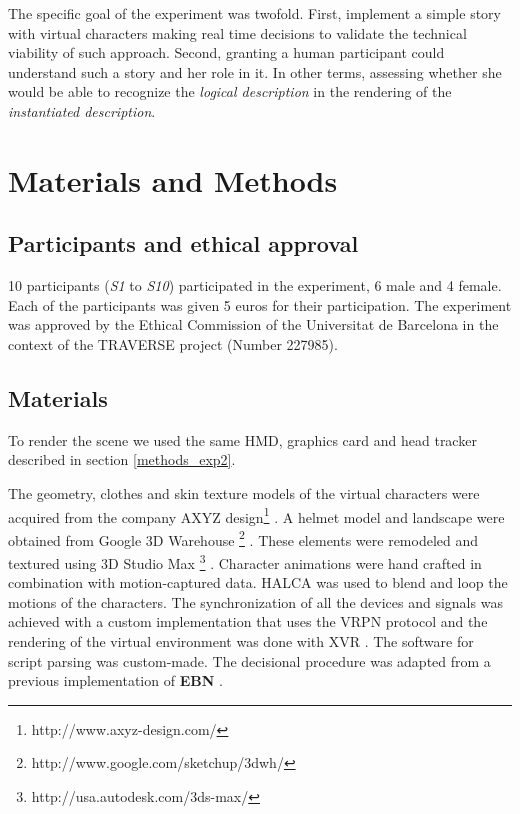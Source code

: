 \documentclass[
		twoside,openright,titlepage,numbers=noenddot,manychapters,
		headinclude,%
                footinclude=false,cleardoublepage=empty,
                BCOR=5mm,
		fontsize=11pt, %
                 enabledeprecatedfontcommands]{scrreprt}
\begin{document}
The specific goal of the experiment was twofold. First, implement a simple story with virtual characters making real time decisions to validate the technical viability of such approach. Second, granting a human participant could understand such a story and her role in it. In other terms, assessing whether she would be able to recognize the \emph{logical description} in the rendering of the \emph{instantiated description}.


\section{Materials and Methods}

\subsection{Participants and ethical approval}
10 participants (\emph{S1} to \emph{S10}) participated in the experiment, 6 male and 4 female. Each of the participants was given 5 euros for their participation. The experiment was approved by the Ethical Commission of the Universitat de Barcelona in the context of the TRAVERSE project (Number 227985).
\subsection{Materials}
To render the scene we used the same HMD, graphics card and head tracker described in section 
\ref{methods_exp2}.


The geometry, clothes and skin texture models of the virtual characters were acquired from the company AXYZ design\footnote{http://www.axyz-design.com/} . A helmet model and landscape were obtained from Google 3D Warehouse \footnote{http://www.google.com/sketchup/3dwh/} . These elements were remodeled and textured using 3D Studio Max \footnote{http://usa.autodesk.com/3ds-max/} . Character animations were hand crafted in combination with motion-captured data. HALCA \cite[]{Spanlang_HALCA_2009} was used to blend and loop the motions of the characters. The synchronization of all the devices and signals was achieved with a custom implementation that uses the VRPN protocol \cite[]{hudson2001vrpn} and the rendering of the virtual environment was done with XVR \cite[]{carrozzino2005lowering}. The software for script parsing was custom-made. The decisional procedure was adapted from a previous implementation of \textbf{EBN}  \cite[]{dorer2004ebn}. %
\end{document}
